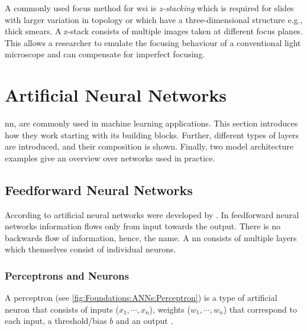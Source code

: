 A commonly used focus method for \ac{wsi} is \emph{z-stacking} \cite{el-gabry2014wholeslide} which is required for slides with larger variation in topology or which have a three-dimensional structure e.g., thick smears. A z-stack consists of multiple images taken at different focus planes. This allows a researcher to emulate the focusing behaviour of a conventional light microscope and can compensate for imperfect focusing.


\section{Artificial Neural Networks}
\label{sec:Foundations:NeuralNetworks}

\Acl{nn}, are commonly used in machine learning applications. This section introduces how they work starting with its building blocks. Further, different types of layers are introduced, and their composition is shown. Finally, two model architecture examples give an overview over networks used in practice.


\subsection{Feedforward Neural Networks}
\label{sec:Foundations:NeuralNetworks:FNN}

According to \textcite{nielsen2015neural} artificial neural networks were developed by \textcite{rosenblatt1958perceptron}. In feedforward neural networks information flows only from input towards the output. There is no backwards flow of information, hence, the name.
A \acf{nn} consists of multiple layers which themselves consist of individual neurons.

\subsubsection{Perceptrons and Neurons}
\label{sec:Foundations:NeuralNetworks:Perceptrons}

A perceptron (see \autoref{fig:Foundations:ANNs:Perceptron}) is a type of artificial neuron that consists of inputs ($x_1, \cdots, x_n$), weights ($w_1, \cdots, w_n$) that correspond to each input, a threshold/bias $b$ and an output \cite{nielsen2015neural}.


